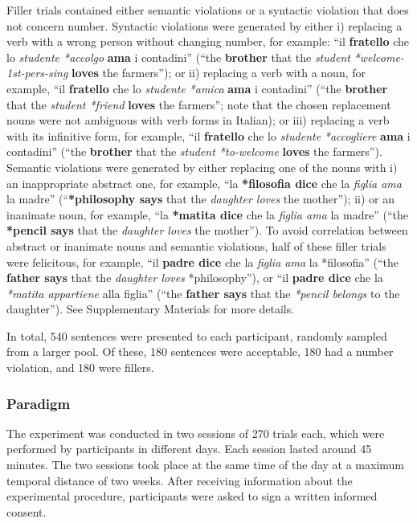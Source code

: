 Filler trials contained either semantic violations or a syntactic violation that does not concern number. 
Syntactic violations were generated by either i) replacing a verb with a wrong person without changing number, for example: ``il \textbf{fratello} che lo \emph{studente *accolgo} \textbf{ama} i contadini'' (``the \textbf{brother} that the \emph{student} \emph{*welcome-1st-pers-sing} \textbf{loves} the farmers''); or ii) replacing a verb with a noun, for example, ``il \textbf{fratello} che lo \emph{studente} \emph{*amica} \textbf{ama} i contadini'' (``the \textbf{brother} that the \emph{student *friend} \textbf{loves} the farmers''; note that the chosen replacement nouns were not ambiguous with verb forms in Italian); or iii) replacing a verb with its infinitive form, for example, ``il \textbf{fratello} che lo \emph{studente} \emph{*accogliere} \textbf{ama} i contadini'' (``the \textbf{brother} that the \emph{student *to-welcome} \textbf{loves} the farmers''). Semantic violations were generated by either replacing one of the nouns with i) an inappropriate abstract one, for example, ``la \textbf{*filosofia dice} che la \emph{figlia ama} la madre'' (``\textbf{*philosophy says} that the \emph{daughter loves} the mother''); ii) or an inanimate noun, for example, ``la \textbf{*matita dice} che la \emph{figlia ama} la madre'' (``the \textbf{*pencil says} that the \emph{daughter loves} the mother''). To avoid correlation between abstract or inanimate nouns and semantic violations, half of these filler trials were felicitous, for example, ``il \textbf{padre dice} che la \emph{figlia ama} la *filosofia'' (``the \textbf{father says} that the \emph{daughter loves} *philosophy''), or ``il \textbf{padre dice} che la \emph{*matita appartiene} alla figlia'' (``the \textbf{father says} that the \emph{*pencil belongs} to the daughter''). 
See Supplementary Materials for more details.

In total, 540 sentences were presented to each participant, randomly sampled from a larger pool. Of these, 180 sentences were acceptable, 180 had a number violation, and 180 were fillers.

\subsubsection{Paradigm}
The experiment was conducted in two sessions of 270 trials each, which were performed by participants in different days. Each session lasted around 45 minutes. The two sessions took place at the same time of the day at a maximum temporal distance of two weeks. After receiving information about the experimental procedure, participants were asked to sign a written informed consent. 

